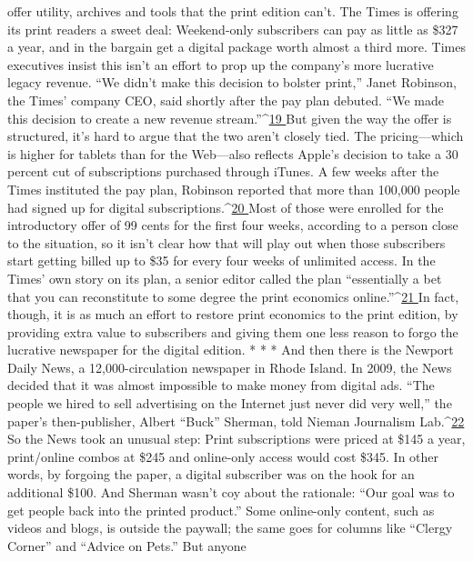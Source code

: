 offer utility, archives and tools that the print edition can’t. The Times is offering
its print readers a sweet deal: Weekend-only subscribers can pay as little as \$327
a year, and in the bargain get a digital package worth almost a third more. Times
executives insist this isn’t an effort to prop up the company’s more lucrative
legacy revenue. ``We didn’t make this decision to bolster print,'' Janet Robinson,
the Times’ company CEO, said shortly after the pay plan debuted. ``We made
this decision to create a new revenue stream.''^{\href{#endnotes-ch5}{19 }}But given the way the offer is
structured, it’s hard to argue that the two aren’t closely tied. The pricing—which
is higher for tablets than for the Web—also reflects Apple’s decision to take a 30
percent cut of subscriptions purchased through iTunes.
A few weeks after the Times instituted the pay plan, Robinson reported that
more than 100,000 people had signed up for digital subscriptions.^{\href{#endnotes-ch5}{20 }}Most of
those were enrolled for the introductory offer of 99 cents for the first four weeks,
according to a person close to the situation, so it isn’t clear how that will play
out when those subscribers start getting billed up to \$35 for every four weeks of
unlimited access.
In the Times’ own story on its plan, a senior editor called the plan ``essentially
a bet that you can reconstitute to some degree the print economics online.''^{\href{#endnotes-ch5}{21 }}In
fact, though, it is as much an effort to restore print economics to the print edition,
by providing extra value to subscribers and giving them one less reason to
forgo the lucrative newspaper for the digital edition.
* * *
And then there is the Newport Daily News, a 12,000-circulation newspaper
in Rhode Island.
In 2009, the News decided that it was almost impossible to make money
from digital ads. ``The people we hired to sell advertising on the Internet just
never did very well,'' the paper’s then-publisher, Albert ``Buck'' Sherman, told
Nieman Journalism Lab.^{\href{#endnotes-ch5}{22 }}So the News took an unusual step: Print subscriptions
were priced at \$145 a year, print/online combos at \$245 and online-only
access would cost \$345.
In other words, by forgoing the paper, a digital subscriber was on the hook for
an additional \$100. And Sherman wasn’t coy about the rationale: ``Our goal was
to get people back into the printed product.''
Some online-only content, such as videos and blogs, is outside the paywall; the
same goes for columns like ``Clergy Corner'' and ``Advice on Pets.'' But anyone
